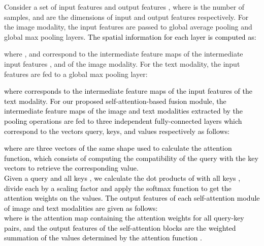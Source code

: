\documentclass[twocolumn]{svjour3}
\begin{document}
Consider a set of input features  and output features , where  is the number of samples,   and  are the dimensions of input and output features respectively. For the image modality, the input features  are passed to global average pooling and global max pooling layers. \textcolor{black}{The spatial information for each layer is computed as:}
\textcolor{black}{

}
\textcolor{black}{

}
where , and  correspond to the intermediate feature maps of the intermediate input features , and  of the image modality.
For the text modality, the input features are fed to a global max pooling layer:

\textcolor{black}{

}
\textcolor{black}{
where  corresponds to the intermediate feature maps of the input features  of the text modality.
For our proposed self-attention-based fusion module, the intermediate feature maps of the image and text modalities extracted by the pooling operations are fed to three independent fully-connected layers which correspond to the vectors query, keys, and values respectively as follows:

where  are three vectors of the same shape used to calculate the attention function, which consists of computing the compatibility of the query with the key vectors to retrieve the corresponding value. \\
Given a query  and all keys , we calculate the dot products of  with all keys , divide each by a scaling factor  and apply the softmax function to get the attention weights on the values. The output features of each self-attention module of image and text modalities  are given as follows:\\


where  is the attention map containing the attention weights for all query-key pairs, and the output features of the self-attention blocks  are the weighted summation of the values  determined by the attention function .}
\end{document}
